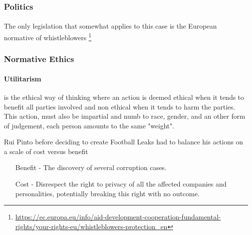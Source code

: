 

\subsubsection{Politics}
\paragraph{}
The only legislation that somewhat applies to this case is the European normative of whistleblowers
\footnote{\url{https://ec.europa.eu/info/aid-development-cooperation-fundamental-rights/your-rights-eu/whistleblowers-protection_en}}


\subsubsection{Normative Ethics}

\paragraph{Utilitarism}
    is the ethical way of thinking where an action is deemed ethical when it tends to benefit all parties involved and non ethical when it tends to harm the parties.
    This action, must also be impartial and numb to race, gender, and an other form of judgement, each person amounts to the same "weight".

    Rui Pinto before deciding to create Football Leaks had to balance his actions on a scale of cost versus benefit
    \begin{enumerate}
        \item [Benefit] - The discovery of several corruption cases.
        \item [Cost] - Disrespect the right to privacy of all the affected companies and personalities, potentially breaking this right with no outcome.
    \end{enumerate}

